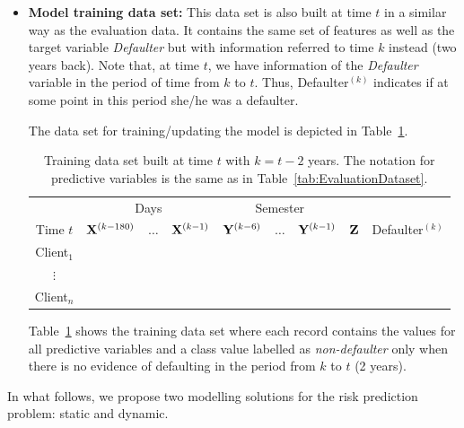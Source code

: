 \begin{itemize}
\item \textbf{Model training data set:}  This data set is also built at time $t$ in a similar way as the evaluation data. It contains the same set of features as well as the target variable \textit{Defaulter} but with information referred to time $k$ instead (two years back). Note that, at time $t$, we have information of the \textit{Defaulter} variable in the period of time from $k$ to $t$. Thus,  Defaulter$^{(k)}$ indicates if at some point in this period she/he was a defaulter.

The data set for training/updating the model is depicted in Table~\ref{tab:TrainingDataset}.
\begin{table}[ht!]
\centering
\begin{tabular}{c|ccc|ccc|c|c}
	&\multicolumn{3}{c|}{Days} & \multicolumn{3}{c|}{Semester} & \\
     Time $t$              & $\mathbf{X}^{(k-180)}$ & $\ldots$ & $\mathbf{X}^{(k-1)} $ & $\mathbf{Y}^{(k-6)}$  & $\ldots$ & $\mathbf{Y}^{(k-1)} $ & $\mathbf{Z}$ & Defaulter$^{(k)}$\\  
\hline
Client$_1$  &                                                  &              &                     &                               &                     &        &  \\ 
$\vdots$      &                                                 &               &                     &                                &                     &       & \\ 
Client$_n$  &                                                &               &                     &                                &                     &     & \\ 
\end{tabular} 
\caption{Training data set built at time $t$ with $k=t - 2$ years.  The notation for predictive variables is the same as in Table~\ref{tab:EvaluationDataset}.}
\label{tab:TrainingDataset} 
\end{table}

Table~\ref{tab:TrainingDataset} shows the training data set where each record contains the values for all predictive variables and a class value labelled as \emph{non-defaulter} only when there is no evidence of defaulting in the period from $k$ to $t$ (2 years). 

\end{itemize}



In what follows, we propose two modelling solutions for the risk prediction problem: static and dynamic.

